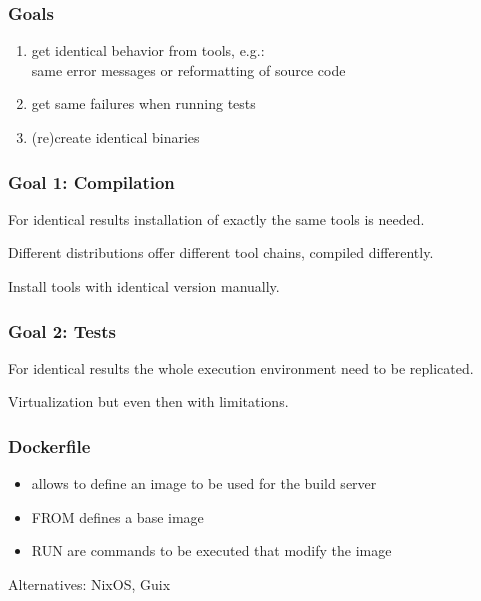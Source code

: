 \begin{frame}
	\frametitle{Goals}

	\begin{enumerate}[<+-| alert@+>]

	\item get identical behavior from tools, e.g.: \\ same error messages or reformatting of source code
	\item get same failures when running tests
	\item (re)create identical binaries
	\end{enumerate}
\end{frame}

\begin{frame}
	\frametitle{Goal 1: Compilation}

	For identical results installation of exactly the same tools is needed.

	\pause

	\begin{problem}
	Different distributions offer different tool chains, compiled differently.
	\end{problem}

	\vspace{1cm}
	\pause

	\begin{solution}
	Install tools with identical version manually.
	\end{solution}
\end{frame}

\begin{frame}
	\frametitle{Goal 2: Tests}

	\begin{problem}
	For identical results the whole execution environment need to be replicated.
	\end{problem}

	\vspace{1cm}
	\pause

	\begin{solution}
	Virtualization but even then with limitations.
	\end{solution}
\end{frame}


\begin{frame}
	\frametitle{Dockerfile}

	\begin{itemize}[<+-| alert@+>]

	\item allows to define an image to be used for the build server
	\item FROM defines a base image
	\item RUN are commands to be executed that modify the image
	\end{itemize}

	\vspace{1cm}

	Alternatives: NixOS, Guix
\end{frame}

